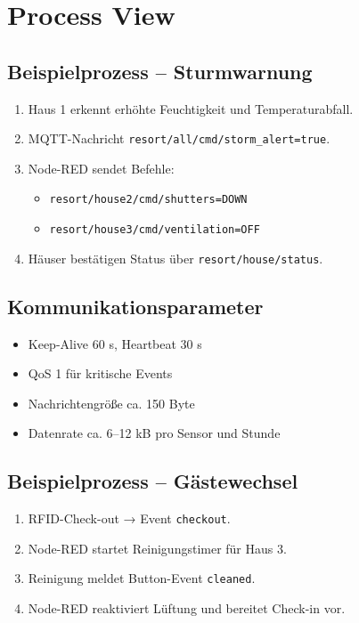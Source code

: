 \section{Process View}
\subsection{Beispielprozess – Sturmwarnung}
\begin{enumerate}[noitemsep]
	\item Haus 1 erkennt erhöhte Feuchtigkeit und Temperaturabfall.
	\item MQTT-Nachricht \texttt{resort/all/cmd/storm\_alert=true}.
	\item Node-RED sendet Befehle:
	\begin{itemize}
		\item \texttt{resort/house2/cmd/shutters=DOWN}
		\item \texttt{resort/house3/cmd/ventilation=OFF}
	\end{itemize}
	\item Häuser bestätigen Status über \texttt{resort/{house}/status}.
\end{enumerate}

\subsection{Kommunikationsparameter}
\begin{itemize}[noitemsep]
	\item Keep-Alive 60 s, Heartbeat 30 s
	\item QoS 1 für kritische Events
	\item Nachrichtengröße ca. 150 Byte
	\item Datenrate ca. 6–12 kB pro Sensor und Stunde
\end{itemize}

\subsection{Beispielprozess – Gästewechsel}
\begin{enumerate}[noitemsep]
	\item RFID-Check-out → Event \texttt{checkout}.
	\item Node-RED startet Reinigungstimer für Haus 3.
	\item Reinigung meldet Button-Event \texttt{cleaned}.
	\item Node-RED reaktiviert Lüftung und bereitet Check-in vor.
\end{enumerate}

